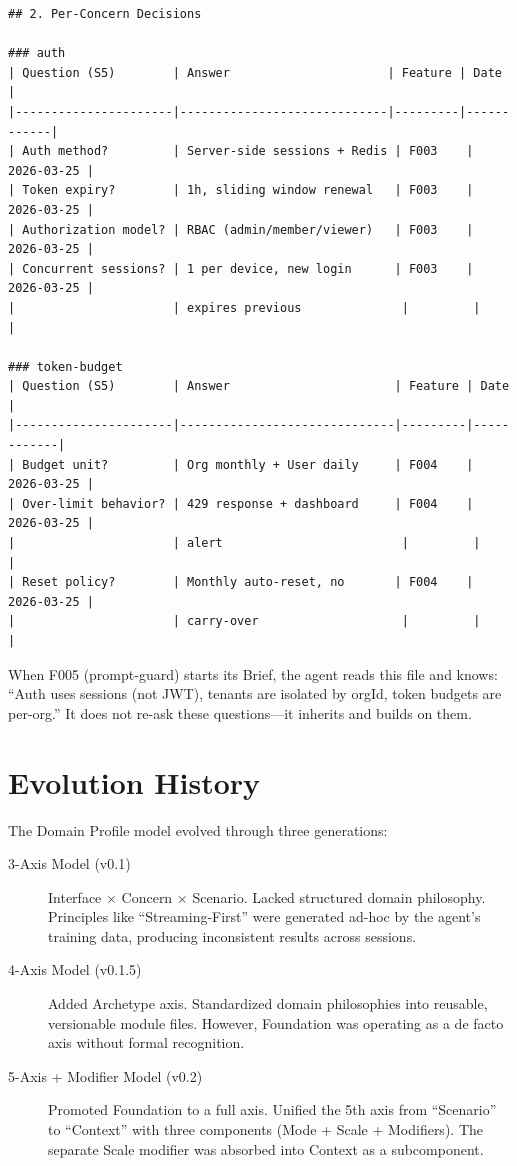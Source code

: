 \documentclass[11pt,a4paper,openright,twoside]{report}
\begin{document}
\begin{lstlisting}
## 2. Per-Concern Decisions

### auth
| Question (S5)        | Answer                      | Feature | Date       |
|----------------------|-----------------------------|---------|------------|
| Auth method?         | Server-side sessions + Redis | F003    | 2026-03-25 |
| Token expiry?        | 1h, sliding window renewal   | F003    | 2026-03-25 |
| Authorization model? | RBAC (admin/member/viewer)   | F003    | 2026-03-25 |
| Concurrent sessions? | 1 per device, new login      | F003    | 2026-03-25 |
|                      | expires previous              |         |            |

### token-budget
| Question (S5)        | Answer                       | Feature | Date       |
|----------------------|------------------------------|---------|------------|
| Budget unit?         | Org monthly + User daily     | F004    | 2026-03-25 |
| Over-limit behavior? | 429 response + dashboard     | F004    | 2026-03-25 |
|                      | alert                         |         |            |
| Reset policy?        | Monthly auto-reset, no       | F004    | 2026-03-25 |
|                      | carry-over                    |         |            |
\end{lstlisting}

When F005 (prompt-guard) starts its Brief, the agent reads this file and knows: ``Auth uses sessions (not JWT), tenants are isolated by orgId, token budgets are per-org.'' It does not re-ask these questions---it inherits and builds on them.

\section{Evolution History}

The Domain Profile model evolved through three generations:

\begin{description}
  \item[3-Axis Model (v0.1)] Interface $\times$ Concern $\times$ Scenario. Lacked structured domain philosophy. Principles like ``Streaming-First'' were generated ad-hoc by the agent's training data, producing inconsistent results across sessions.
  \item[4-Axis Model (v0.1.5)] Added Archetype axis. Standardized domain philosophies into reusable, versionable module files. However, Foundation was operating as a de facto axis without formal recognition.
  \item[5-Axis + Modifier Model (v0.2)] Promoted Foundation to a full axis. Unified the 5th axis from ``Scenario'' to ``Context'' with three components (Mode + Scale + Modifiers). The separate Scale modifier was absorbed into Context as a subcomponent.
\end{description}
\end{document}
